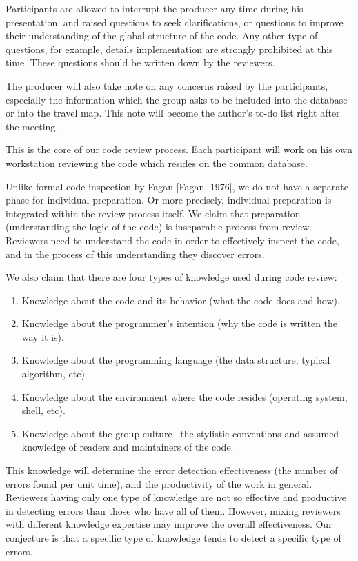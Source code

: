 Participants are allowed to interrupt the producer any time during
his presentation, and raised questions to seek clarifications,
or questions to improve their understanding of the global structure
of the code.
Any other type of questions, for example,
details implementation are strongly prohibited at this time.
These questions should be written down  by the reviewers.

The producer will also take note on any concerns raised by the
participants, especially the information which the group
asks to be included into  the database or into the travel map.
This note will become the author's to-do list right after the
meeting.


This is the core of our code review process.  Each participant
will work on his own workstation reviewing the code which resides
on the common database.

Unlike formal code inspection by Fagan [Fagan, 1976], we do not have 
a separate phase for individual preparation.  Or more precisely, individual
preparation is integrated within the review process itself.
We claim  that preparation (understanding the logic of the code)
is inseparable process from  review.  
Reviewers need to understand the code in order to effectively
inspect the code, and in the process of this understanding 
they discover errors. 

\noindent We also claim that there are four types of knowledge used during code 
review:
\begin {enumerate}
\item Knowledge about the code and its behavior (what the
code does and how).
\item Knowledge about the programmer's intention (why the
code is written the way it is).
\item Knowledge about the programming language 
(the data structure, typical algorithm, etc).
\item Knowledge about the environment where the code resides 
(operating system, shell, etc).
\item Knowledge about the group culture --the stylistic conventions
and assumed knowledge of readers and maintainers of the code.
\end {enumerate}

This knowledge will determine the error
detection effectiveness (the number of errors found per unit time), 
and the productivity of the work in general.
Reviewers having only one type of knowledge are not
so effective and productive in detecting errors than those who
have all of them.  However, mixing reviewers with
 different knowledge expertise may improve the overall
effectiveness.  Our conjecture is that a specific type of knowledge
tends to detect a specific type of errors.

